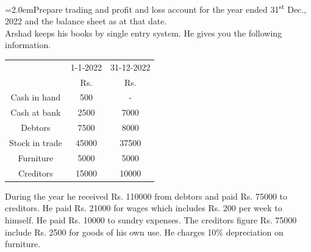 \documentclass[11pt,a4paper]{article}
\newcommand{\lqn}[2]{\Needspace{6\baselineskip}\par\medskip\noindent\hangindent=2.0em\hangafter=1\makebox[2.0em][l]{\textbf{#1.}}#2\par}
\begin{document}
\lqn{14}{Prepare trading and profit and loss account for the year ended 31\textsuperscript{st} Dec., 2022 and the balance sheet as at that date.\\
Arshad keeps his books by single entry system. He gives you the following information.\par
\par\smallskip\noindent\hspace*{1.2em}\begin{tabular}{|ccc|}
\hline
 & 1-1-2022 & 31-12-2022 \\
 & Rs. & Rs. \\
Cash in hand & 500 & - \\
Cash at bank & 2500 & 7000 \\
Debtors & 7500 & 8000 \\
Stock in trade & 45000 & 37500 \\
Furniture & 5000 & 5000 \\
Creditors & 15000 & 10000 \\
\hline
\end{tabular}\par\smallskip
During the year he received Rs. 110000 from debtors and paid Rs. 75000 to creditors. He paid Rs. 21000 for wages which includes Rs. 200 per week to himself. He paid Rs. 10000 to sundry expenses. The creditors figure Rs. 75000 include Rs. 2500 for goods of his own use. He charges 10\% depreciation on furniture.\par
}
\end{document}
